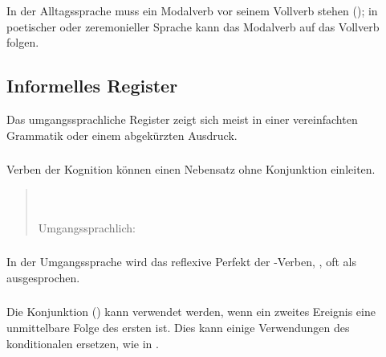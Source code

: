 \subsubsection{} In der Alltagssprache muss ein Modalverb vor seinem Vollverb stehen (); in poetischer oder zeremonieller Sprache kann das Modalverb auf das Vollverb folgen.

\subsection{Informelles Register} Das umgangssprachliche Register zeigt sich meist in einer vereinfachten Grammatik oder einem abgekürzten Ausdruck.

\subsubsection{} Verben der Kognition können einen Nebensatz ohne Konjunktion einleiten.

\begin{quotation}
\noindent{}\\
\noindent{}\\
\noindent Umgangssprachlich: 
\end{quotation}

\subsubsection{} In der Umgangssprache wird das reflexive Perfekt der -Verben, , oft als  ausgesprochen.

\subsubsection{} Die Konjunktion  () kann verwendet werden, wenn ein zweites Ereignis eine unmittelbare Folge des ersten ist. Dies kann einige Verwendungen des konditionalen  ersetzen, wie in  .

